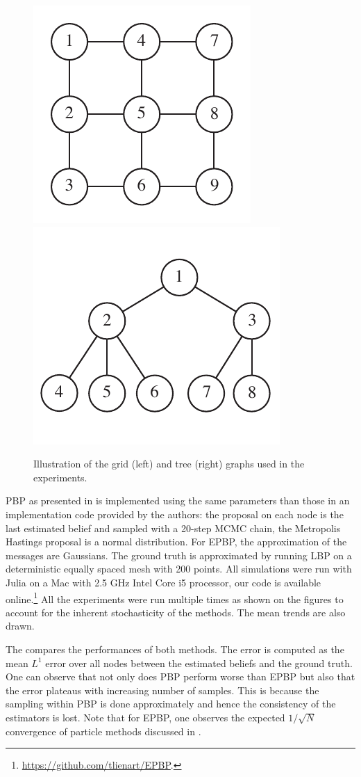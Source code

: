 \begin{figure}[!h]
\center
	\includegraphics[width=.3\textwidth]{figures/epbp/grid33}
	\hspace*{1cm}
	\includegraphics[width=.3\textwidth]{figures/epbp/tree8}
	\caption{\label{fig:grids}Illustration of the grid (left) and tree (right) graphs used in the experiments.}
\end{figure}

PBP as presented in \citet{ihler09} is implemented using the same parameters than those in an implementation code provided by the authors: the proposal on each node is the last estimated belief and sampled with a 20-step MCMC chain, the Metropolis Hastings proposal is a normal distribution. For EPBP, the approximation of the messages are Gaussians. The ground truth is approximated by running LBP on a deterministic equally spaced mesh with 200 points. All simulations were run with Julia on a Mac with 2.5 GHz Intel Core i5 processor, our code is available online.\footnote{\url{https://github.com/tlienart/EPBP}.} All the experiments were run multiple times as shown on the figures to account for the inherent stochasticity of the methods. The mean trends are also drawn.

The  compares the performances of both methods. The error is computed as the mean $L^{1}$ error over all nodes between the estimated beliefs and the ground truth. One can observe that not only does PBP perform worse than EPBP but also that the error plateaus with increasing number of samples. This is because the sampling within PBP is done approximately and hence the consistency of the estimators is lost. Note that for EPBP, one observes the expected $1/\sqrt{N}$ convergence of particle methods discussed in \citet{ihler09}.

